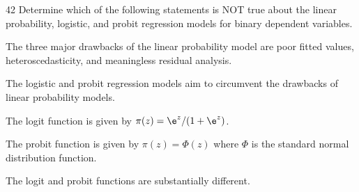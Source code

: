 \begin{question}{42}
Determine which of the following statements is NOT true about the linear probability, logistic, and probit regression models for binary dependent variables.

\begin{choices}
\item The three major drawbacks of the linear probability model are poor fitted values, heteroscedasticity, and meaningless residual analysis.
\item The logistic and probit regression models aim to circumvent the drawbacks of linear probability models.
\item The logit function is given by $\pi(z) = \e^{z} / (1 + \e^{z})$.
\item The probit function is given by $\pi(z) = \Phi(z)$ where $\Phi$ is the standard normal distribution function.
\item The logit and probit functions are substantially different.
\end{choices}
\end{question}

